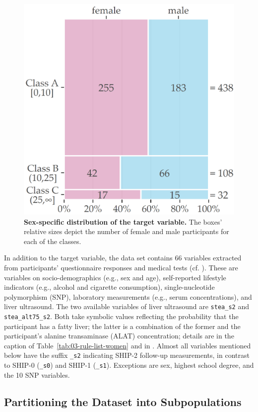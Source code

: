 \documentclass[
  oneside]{book}
\begin{document}
\begin{figure}[htb]

{\centering \includegraphics[width=0.5\linewidth]{figures/03-fatty-liver-mosaic} 

}

\caption{\textbf{Sex-specific distribution of the target variable.} The boxes' relative sizes depict the number of female and male participants for each of the classes.}\label{fig:03-fatty-liver-mosaic}
\end{figure}

In addition to the target variable, the data set contains 66 variables extracted from participants' questionnaire responses and medical tests (cf. \autocite{Voelzke:SHIP11}).
These are variables on socio-demographics (e.g., sex and age),
self-reported lifestyle indicators (e.g., alcohol and cigarette consumption), single-nucleotide polymorphism (SNP), laboratory measurements (e.g., serum concentrations), and liver ultrasound.
The two available variables of liver ultrasound are \texttt{stea\_s2} and \texttt{stea\_alt75\_s2}.
Both take symbolic values reflecting the probability that the participant has a fatty liver; the latter is a combination of the former and the participant's alanine transaminase (ALAT) concentration; details are in the caption of Table~\ref{tab:03-rule-list-women} and in \autocite{Voelzke:SHIP11}.
Almost all variables mentioned below have the suffix \texttt{\_s2} indicating SHIP-2 follow-up measurements, in contrast to SHIP-0 (\texttt{\_s0}) and SHIP-1 (\texttt{\_s1}).
Exceptions are sex, highest school degree, and the 10 SNP variables.

\hypertarget{imm-workflow-partitioning}{%
\subsection{Partitioning the Dataset into Subpopulations}\label{imm-workflow-partitioning}}
\end{document}
